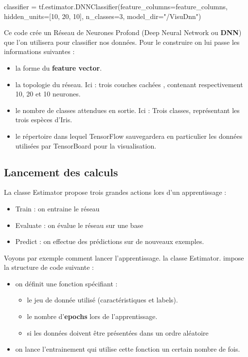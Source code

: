 \documentclass[a4paper,11pt]{book}
\begin{document}
\begin{mypython}
classifier = tf.estimator.DNNClassifier(feature_columns=feature_columns,
                                          hidden_units=[10, 20, 10],
                                          n_classes=3,
                                          model_dir="/VisuDnn")
\end{mypython}
Ce code crée un Réseau de Neurones Profond (Deep Neural Network ou \textbf{DNN}) que l'on utilisera pour classifier nos données. Pour le construire on lui passe les informations suivantes :
\begin{itemize}
\item la forme du \textbf{feature vector}.
\item la topologie du réseau. Ici : trois couches cachées , contenant respectivement 10, 20 et 10 neurones.
\item le nombre de classes attendues en sortie. Ici : Trois classes, représentant les trois espèces d'Iris.
\item le répertoire dans lequel TensorFlow sauvegardera en particulier les données utilisées par  TensorBoard pour la visualisation.
\end{itemize}

\subsection{Lancement des calculs}
La classe Estimator propose trois grandes actions lors d'un apprentissage :
\begin{itemize}
\item Train : on entraine le réseau
\item Evaluate : on évalue le réseau sur une base
\item Predict : on effectue des prédictions sur de nouveaux exemples.
\end{itemize}

Voyons par exemple comment lancer l'apprentissage. la classe Estimator. impose la structure de code suivante :
\begin{itemize}
	\item on définit une fonction spécifiant :
	\begin{itemize}	
		\item le jeu de donnée utilisé (caractéristiques et labels).
		\item le nombre d'\textbf{epochs} lors de l'apprentissage.
		\item si les données doivent être présentées dans un ordre aléatoire
	\end{itemize}
	\item on lance l'entrainement qui utilise cette fonction un certain nombre de fois.
\end{itemize}
\end{document}
